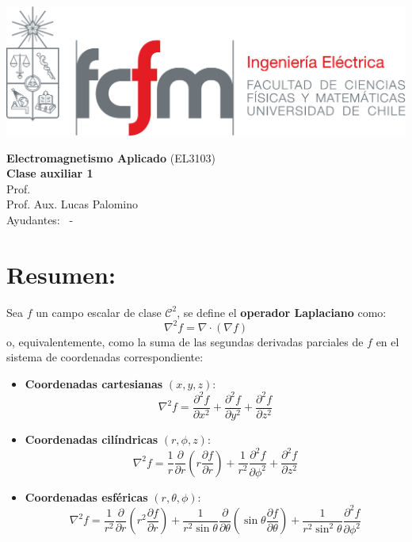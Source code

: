 \documentclass[
  11pt,
  letterpaper,
   answers
  ]{exam}
\begin{document}
\noindent
\begin{minipage}{0.47\textwidth}
  \includegraphics[width=\textwidth]{../fcfm_die}
\end{minipage}
\begin{minipage}{0.53\textwidth}
\begin{center} 
\large\textbf{Electromagnetismo Aplicado} (EL3103) \\
\large\textbf{Clase auxiliar 1} \\
\normalsize Prof.~\professor\\
\normalsize Prof. Aux. Lucas Palomino
\\
\normalsize Ayudantes: \ayudanteA~-~\ayudanteB
\end{center}
\end{minipage}

\vspace{0.5cm}
\noindent
\vspace{.85cm}

\section{Resumen:}

Sea $f$ un campo escalar de clase $\mathcal{C}^2$, se define el \textbf{operador Laplaciano} como:
\[
\nabla^2 f = \nabla \cdot (\nabla f)
\]
o, equivalentemente, como la suma de las segundas derivadas parciales de $f$ en el sistema de coordenadas correspondiente:

\begin{itemize}
    \item \textbf{Coordenadas cartesianas} $(x,y,z)$:
    \[
    \nabla^2 f = \frac{\partial^2 f}{\partial x^2}
               + \frac{\partial^2 f}{\partial y^2}
               + \frac{\partial^2 f}{\partial z^2}
    \]

    \item \textbf{Coordenadas cilíndricas} $(r,\phi,z)$:
    \[
    \nabla^2 f = \frac{1}{r} \frac{\partial}{\partial r}
    \left( r \frac{\partial f}{\partial r} \right)
    + \frac{1}{r^2} \frac{\partial^2 f}{\partial \phi^2}
    + \frac{\partial^2 f}{\partial z^2}
    \]

    \item \textbf{Coordenadas esféricas} $(r,\theta,\phi)$:
    \[
    \nabla^2 f =
    \frac{1}{r^2} \frac{\partial}{\partial r}
    \left( r^2 \frac{\partial f}{\partial r} \right)
    + \frac{1}{r^2 \sin\theta} \frac{\partial}{\partial \theta}
    \left( \sin\theta \frac{\partial f}{\partial \theta} \right)
    + \frac{1}{r^2 \sin^2\theta} \frac{\partial^2 f}{\partial \phi^2}
    \]
\end{itemize}
\end{document}
